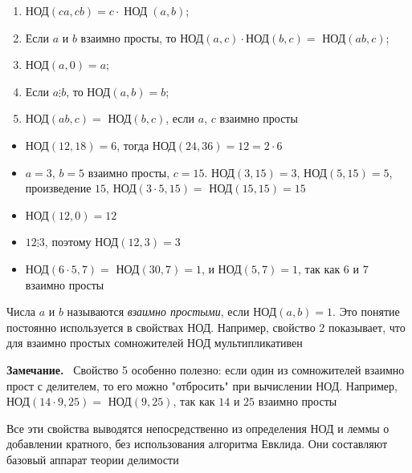 \documentclass[a4paper,12pt]{article}
\newcommand{\myremark}{\textbf{Замечание.}\ }
\theoremstyle{definition}
\theoremstyle{plain}
\theoremstyle{remark}
\begin{document}
	\begin{enumerate}
		\item НОД$(ca, cb) = c \cdot \operatorname{НОД}(a, b)$;
		\item Если $a$ и $b$ взаимно просты, то НОД$(a, c) \cdot $НОД$(b, c) =$ НОД$(ab, c)$;
		\item НОД$(a, 0) = a$;
		\item Если $a \vdots b$, то НОД$(a, b) = b$;
		\item НОД$(ab, c) =$ НОД$(b, c)$, если $a$, $c$ взаимно просты
	\end{enumerate}
	
	\begin{tcolorbox}[colback=gray!5, colframe=gray!50, title=Примеры на свойства]
		\begin{itemize}
			\item[1.] НОД$(12, 18) = 6$, тогда НОД$(24, 36) = 12 = 2 \cdot 6$
			\item[2.] $a=3$, $b=5$ взаимно просты, $c=15$. НОД$(3,15)=3$, НОД$(5,15)=5$, произведение $15$, НОД$(3\cdot5,15)=$ НОД$(15,15)=15$
			\item[3.] НОД$(12,0)=12$
			\item[4.] $12 \vdots 3$, поэтому НОД$(12,3)=3$
			\item[5.] НОД$(6\cdot 5, 7) = $ НОД$(30,7)=1$, и НОД$(5,7)=1$, так как $6$ и $7$ взаимно просты
		\end{itemize}
	\end{tcolorbox}
	
	\begin{tcolorbox}[colback=purple!5, colframe=purple!50!black, title=Заметочка: Взаимно простые числа]
		Числа $a$ и $b$ называются \textit{взаимно простыми}, если НОД$(a, b) = 1$. Это понятие постоянно используется в свойствах НОД. Например, свойство 2 показывает, что для взаимно простых сомножителей НОД мультипликативен
	\end{tcolorbox}
	
	\myremark
	Свойство 5 особенно полезно: если один из сомножителей взаимно прост с делителем, то его можно "отбросить" при вычислении НОД. Например, НОД$(14 \cdot 9, 25) =$ НОД$(9, 25)$, так как $14$ и $25$ взаимно просты
	
	\begin{tcolorbox}[colback=yellow!5, colframe=orange!60!black, title=Важное замечание]
		Все эти свойства выводятся непосредственно из определения НОД и леммы о добавлении кратного, без использования алгоритма Евклида. Они составляют базовый аппарат теории делимости
	\end{tcolorbox}
	
\end{document}
